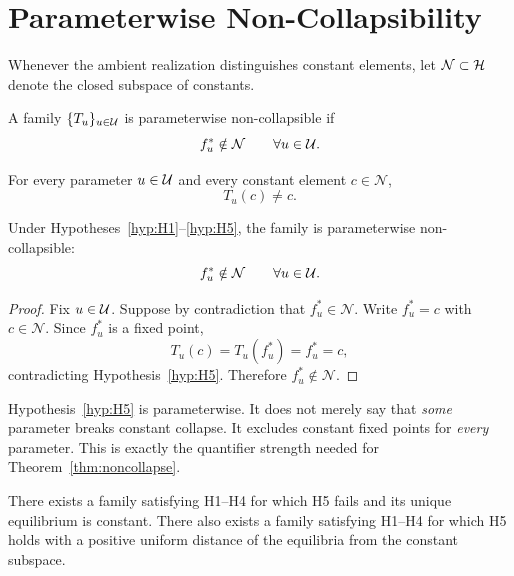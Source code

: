 \section{Parameterwise Non-Collapsibility}\label{sec:parameterwise-noncollapse}

\begin{definition}
Whenever the ambient realization distinguishes constant elements, let $\mathcal{N}\subset\mathcal{H}$ denote the closed subspace of constants.
\end{definition}

\begin{definition}
A family $\{T_u\}_{u\in\mathcal{U}}$ is parameterwise non-collapsible if
\[
f_u^\ast\notin\mathcal{N}
\qquad
\forall u\in\mathcal{U}.
\]
\end{definition}

\begin{hypothesis}\label{hyp:H5}
For every parameter $u\in\mathcal{U}$ and every constant element $c\in\mathcal{N}$,
\[
T_u(c)\neq c.
\]
\end{hypothesis}

\begin{theorem}\label{thm:noncollapse}
Under Hypotheses~\ref{hyp:H1}--\ref{hyp:H5}, the family is parameterwise non-collapsible:
\[
f_u^\ast\notin\mathcal{N}
\qquad
\forall u\in\mathcal{U}.
\]
\end{theorem}

\begin{proof}
Fix $u\in\mathcal{U}$. Suppose by contradiction that $f_u^\ast\in\mathcal{N}$. Write $f_u^\ast=c$ with $c\in\mathcal{N}$. Since $f_u^\ast$ is a fixed point,
\[
T_u(c)=T_u(f_u^\ast)=f_u^\ast=c,
\]
contradicting Hypothesis~\ref{hyp:H5}. Therefore $f_u^\ast\notin\mathcal{N}$.
\end{proof}

\begin{remark}
Hypothesis~\ref{hyp:H5} is parameterwise. It does not merely say that \emph{some} parameter breaks constant collapse. It excludes constant fixed points for \emph{every} parameter. This is exactly the quantifier strength needed for Theorem~\ref{thm:noncollapse}.
\end{remark}

\begin{proposition}\label{prop:h5-not-derived}
There exists a family satisfying H1--H4 for which H5 fails and its unique equilibrium is constant. There also exists a family satisfying H1--H4 for which H5 holds with a positive uniform distance of the equilibria from the constant subspace.
\end{proposition}

